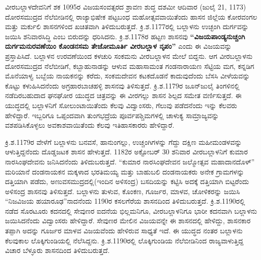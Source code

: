 ವೀರಬಲ್ಲಾಳದೇವನಿಗೆ ಶಕ 1095ರ ವಿಜಯಸಂವತ್ಸರದ ಶ್ರಾವಣ ಶುದ್ಧ ದಶಮೀ ಆದಿವಾರ (ಜುಲೈ 21, 1173) ದೋರಸಮುದ್ರದ ನೆಲೆಬೀಡಿನಲ್ಲಿ ರಾಜ್ಯಾಭಿಷೇಕ ಪಟ್ಟಬಂಧ ಮಹೋತ್ಸವವಾಯಿತೆಂದು ಹಾಸನ ಜಿಲ್ಲೆಯ ಕೋರವಂಗಲ ಮತ್ತು ಮರ್ಕುಲಿ ಶಾಸನಗಳಿಂದ ಖಚಿತವಾಗಿ ತಿಳಿದುಬರುತ್ತದೆ. ಕ್ರಿ.ಶ.1177ರಲ್ಲಿ ಬಲ್ಲಾಳನು ಉಚ್ಛಂಗಿ ದುರ್ಗವನ್ನು ಜಯಿಸಿ ಶನಿವಾರಸಿದ್ಧಿ ಎಂಬ ಬಿರುದನ್ನು ಧರಿಸಿದನು. ಕ್ರಿ.ಶ.1178ರ ಹಟ್ಟಣ ಶಾಸನವು \textbf{“ವಿಜಯಪಾಂಡ್ಯನುಚ್ಚಂಗಿ ದುರ್ಗಮನುರವಣೆಯಿಂ ಕೊಂಡನಸಮ ತೇಜೋಮೂರ್ತಿ ವೀರಬಲ್ಲಾಳ ನೃಪಂ”} ಎಂದು ಈ ವಿಜಯವನ್ನು ಪ್ರಸ್ತಾಪಿಸಿದೆ. ಬಲ್ಲಾಳನ ಉರವಣೆಯಿಂದ ಕಳಚುರಿ ಸಂಕಮನು ವೀರಬಲ್ಲಾಳನ ಮೇಲೆ ಬಿದ್ದನು. ಆಗ ವೀರಬಲ್ಲಾಳನು ದೋರಸಮುದ್ರದ ನೆಲೆಬೀಡಿಗೆ, ಕಬ್ಬಾಹುನಾಡನ್ನು ಆಳುವ ಮಹಾಸಾಮಂತ ಗಂಡನಾರಾಯಣ ಸೆಟ್ಟಿಯ ಮಗ, ಕನ್ನಡಿಗ ಮೊನೆಯಾಳ್ವ ಬಬ್ಬೆಯ ನಾಯಕನನ್ನು ಕರೆದು, ಸಂಕಮದೇವನ ಕಟಕದೊಡನೆ ಕಾದುವುದೆಂದು ಬೆಸಸಿ ವೀಳೆಯವನ್ನು ಕೊಟ್ಟು ಕಳುಹಿಸಿದನೆಂದು ಅಗ್ರಹಾರಬಾಚಹಳ್ಳಿ ಶಾಸನವು ತಿಳಿಸುತ್ತದೆ. ಕ್ರಿ.ಶ.1179ರ ಜೂನ್​\enginline{-}ಜುಲೈ ತಿಂಗಳಿನಲ್ಲಿ ನಡೆದಿರಬಹುದಾದ ಘನಘೋರ ಯುದ್ಧದ ಚಿತ್ರವನ್ನು ಈ ವೀರಗಲ್ಲು ಶಾಸನ ಶಿಲ್ಪದ ಸಮೇತ ವರ್ಣಿಸುತ್ತದೆ. ಈ ಯುದ್ಧದಲ್ಲಿ ಬಲ್ಲಾಳನಿಗೆ ಸೋಲುಂಟಾಯಿ\-ತೆಂದು ಕೆಲವು ವಿದ್ವಾಂಸರು, ಗೆಲುವು ಪಡೆದನೆಂದು ಇನ್ನು ಕೆಲವರು ಹೇಳಿದ್ದಾರೆ. ಇಬ್ಬರಿಗೂ ಒಪ್ಪಂದವಾಗಿ ತುಂಗಭದ್ರೆಯ ಪೂರ್ವಪಶ್ಚಿಮಗಳಲ್ಲಿ ಚಾಳುಕ್ಯ ಸಾಮ್ರಾಜ್ಯವನ್ನು ವಶಪಡಿಸಿಕೊಳ್ಳಲು ಅವಕಾಶವಾಯಿತೆಂದು ಕೆಲವು ಇತಿಹಾಸ\-ಕಾರರು ಹೇಳಿದ್ದಾರೆ.

ಕ್ರಿ.ಶ.1179ರ ವೇಳೆಗೆ ಬಲ್ಲಾಳನು ಬನವಸೆ, ಹಾನುಂಗಲ್ಲು, ಉಚ್ಚಂಗಿಗಳನ್ನು ಗೆದ್ದು ದಕ್ಷಿಣ ಮಹೀಮಂಡಳವನ್ನು ಆಳುತ್ತಿದ್ದನೆಂದು ದೊಡ್ಡಜಟಕ ಶಾಸನ ಹೇಳುತ್ತದೆ. 1182ರ ಅಕ್ಟೋಬರ್​ 30 ಶನಿವಾರ ವೀರಬಲ್ಲಾಳನಿಗೆ ಕುಮಾರ ನಾರಸಿಂಘದೇವನು ಜನಿಸಿದನೆಂದು ತಿಳಿದುಬರುತ್ತದೆ. “ಕುಮಾರ ನಾರಸಿಂಘದೇವನ ಜಲ್ಮೋತ್ಸವ ಮಹಾದಾನದೊಳ್​” ಮರಿಯಾನೆ ದಂಡನಾಯಕನ ಮಕ್ಕಳಾದ ಭರತಿಮಯ್ಯ ಮತ್ತು ಬಾಹುಬಲಿ ದಂಡನಾಯಕರು ಅನೇಕ ಗ್ರಾಮಗಳನ್ನು ದತ್ತಿಯಾಗಿ ಪಡೆದು, ಅಣುವಸಮುದ್ರದಲ್ಲಿ(ಇಂದಿನ ಅಳಿಸಂದ್ರ) ಬಸದಿಯನ್ನು ಕಟ್ಟಿಸಿ ಅದಕ್ಕೆ ದತ್ತಿಯಾಗಿ ಬಿಟ್ಟರೆಂದು ಅಳಿಸಂದ್ರ ಶಾಸನವು ತಿಳಿಸುತ್ತದೆ. ಬಲ್ಲಾಳನು ತುಳುವ, ಕೊಂಕಣ, ಗೂರ್ಜರ, ಮಾಳವ, ಚೋಳಿಕರನ್ನು ಜಯಿಸಿ “ನಿಜವಿಜಯ ಹಯಾರೂಢ”ನಾದನೆಂದು 1190ರ ಕಸಲಗೆರೆಯ ಶಾಸನದಿಂದ ತಿಳಿದುಬರುತ್ತದೆ. ಕ್ರಿ.ಶ.1190ರಲ್ಲಿ ನಡೆದ ಸೊರಟೂರು ಕದನದಲ್ಲಿ ಸೇವುಣರ ಐದನೆಯ ಭಿಲ್ಲಮನಿಗೂ, ವೀರಬಲ್ಲಾಳನಿಗೂ ಭಾರೀ ಕದನವಾಗಿ ಬಲ್ಲಾಳನು ಜಯಿಸಿದನೆಂದು ವಿದ್ವಾಂಸರು ಹೇಳಿದ್ದಾರೆ. ಸೇವುಣರ ಮೇಲಿನ ವಿಜಯವನ್ನೇ ಈ ಶಾಸನದಲ್ಲಿ ಹೇಳಿದ್ದು, ಶಾಸನಕಾರ ತಪ್ಪಾಗಿ ಅದನ್ನು ಗೂರ್ಜರ ಮಾಳವ ವಿಜಯವೆಂದು ಹೇಳಿರುವ ಸಾಧ್ಯತೆ ಇದೆ. ಈ ಯುದ್ಧದ ನಂತರ ಬಲ್ಲಾಳನು ಕೆಲವುಕಾಲ ಲೊಕ್ಕಿಗುಂಡಿಯಲ್ಲಿ ನೆಲೆಸಿದ್ದನು. ಕ್ರಿ.ಶ.1190ರಲ್ಲಿ ಲೊಕ್ಕಿಗುಂಡಿಯ ನೆಲೆಬೀಡಿನಿಂದ ರಾಜ್ಯವಾಳುತ್ತಿದ್ದ ವಿಚಾರ ಬೆಳ್ಳೂರು ಶಾಸನದಿಂದ ತಿಳಿದುಬರುತ್ತದೆ.

